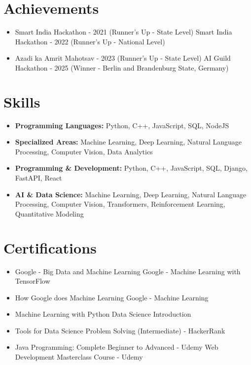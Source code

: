 \documentclass[a4paper,10pt]{article}
\begin{document}
\section*{Achievements}
\begin{itemize}
\item Smart India Hackathon - 2021 (Runner's Up - State Level) \hfill Smart India Hackathon - 2022 (Runner's Up - National Level)
\item Azadi ka Amrit Mahotsav - 2023 (Runner's Up - State Level) \hfill AI Guild Hackathon - 2025 (Winner - Berlin and Brandenburg State, Germany)
\end{itemize}

\section*{Skills}
\begin{itemize}
  \item \textbf{Programming Languages:} Python, C++, JavaScript, SQL, NodeJS
  \item \textbf{Specialized Areas:} Machine Learning, Deep Learning, Natural Language Processing, Computer Vision, Data Analytics
  \item \textbf{Programming \& Development:} Python, C++, JavaScript, SQL, Django, FastAPI, React
  \item \textbf{AI \& Data Science:} Machine Learning, Deep Learning, Natural Language Processing, Computer Vision, Transformers, Reinforcement Learning, Quantitative Modeling
\end{itemize}

\section*{Certifications}
\begin{itemize}
\item Google - Big Data and Machine Learning \hfill Google - Machine Learning with TensorFlow
\item How Google does Machine Learning \hfill Google - Machine Learning
\item Machine Learning with Python \hfill Data Science Introduction
\item Tools for Data Science \hfill Problem Solving (Intermediate) - HackerRank
\item Java Programming: Complete Beginner to Advanced - Udemy \hfill Web Development Masterclass Course - Udemy
\end{itemize}
\end{document}
